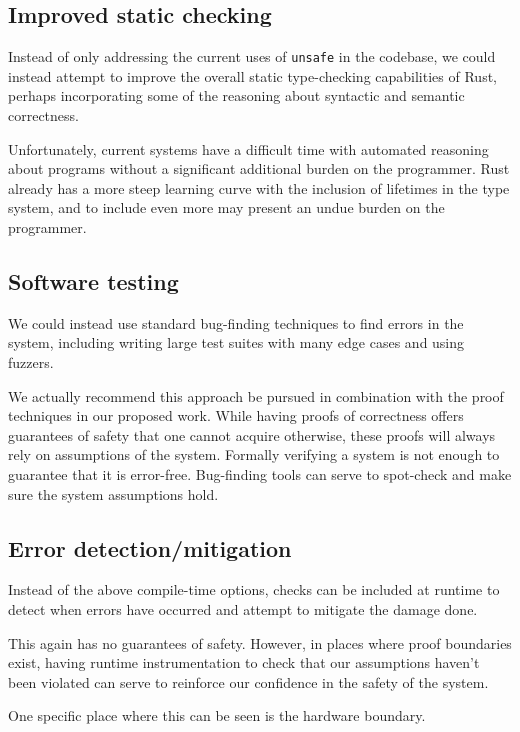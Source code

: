 \documentclass[12pt]{article}
\begin{document}
\subsection{Improved static checking}
Instead of only addressing the current uses of \texttt{unsafe} in the codebase, we could instead attempt to improve the overall static type-checking capabilities of Rust, perhaps incorporating some of the reasoning about syntactic and semantic correctness.

Unfortunately, current systems have a difficult time with automated reasoning about programs without a significant additional burden on the programmer. Rust already has a more steep learning curve with the inclusion of lifetimes in the type system, and to include even more may present an undue burden on the programmer.

\subsection{Software testing}
We could instead use standard bug-finding techniques to find errors in the system, including writing large test suites with many edge cases and using fuzzers. 

We actually recommend this approach be pursued in combination with the proof techniques in our proposed work. While having proofs of correctness offers guarantees of safety that one cannot acquire otherwise, these proofs will always rely on assumptions of the system. Formally verifying a system is not enough to guarantee that it is error-free\cite{fonseca2017empirical}. Bug-finding tools can serve to spot-check and make sure the system assumptions hold.
    
\subsection{Error detection/mitigation}
Instead of the above compile-time options, checks can be included at runtime to detect when errors have occurred and attempt to mitigate the damage done. 

This again has no guarantees of safety. However, in places where proof boundaries exist, having runtime instrumentation to check that our assumptions haven't been violated can serve to reinforce our confidence in the safety of the system.

One specific place where this can be seen is the hardware boundary. %
\end{document}
